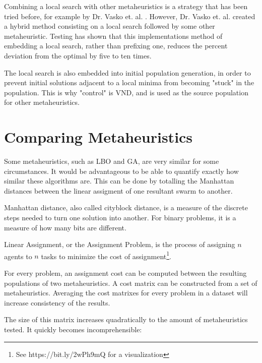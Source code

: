 \documentclass[11pt, letterpaper, onecolumn]{article}
\begin{document}
\begin{table}[htbp]
\end{table}

Combining a local search with other metaheuristics is a strategy that has been tried before, for example by Dr. Vasko et. al. \cite{mmkp}. However, Dr. Vasko et. al. created a hybrid method consisting on a local search followed by some other metaheuristic. Testing has shown that this implementations method of embedding a local search, rather than prefixing one, reduces the percent deviation from the optimal by five to ten times. 

The local search is also embedded into initial population generation, in order to prevent initial solutions adjacent to a local minima from becoming "stuck" in the population. This is why "control" is VND, and is used as the source population for other metaheuristics. 

\section{Comparing Metaheuristics} \label{compare}

Some metaheuristics, such as LBO and GA, are very similar for some circumstances. It would be advantageous to be able to quantify exactly how similar these algorithms are. This can be done by totalling the Manhattan distances between the linear assigment of one resultant swarm to another. 

Manhattan distance, also called cityblock distance, is a measure of the discrete steps needed to turn one solution into another. For binary problems, it is a measure of how many bits are different. 

Linear Assignment, or the Assignment Problem, is the process of assigning $n$ agents to $n$ tasks to minimize the cost of assignment\footnote{See https://bit.ly/2wPh9mQ for a visualization}. 

For every problem, an assignment cost can be computed between the resulting populations of two metaheuristics. A cost matrix can be constructed from a set of metaheuristics. Averaging the cost matrixes for every problem in a dataset will increase consistency of the results. 

The size of this matrix increases quadratically to the amount of metaheuristics tested. It quickly becomes incomprehensible:
\end{document}
